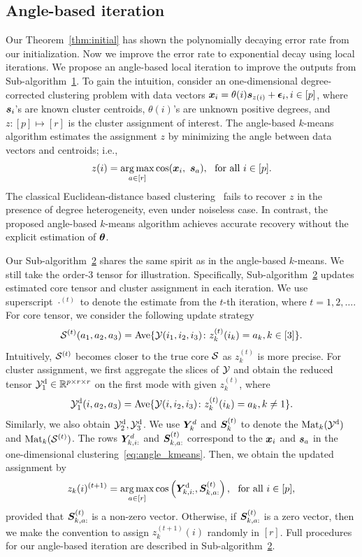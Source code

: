 \documentclass[journal]{IEEEtran}
\theoremstyle{definition}
\theoremstyle{definition}
\newcommand{\of}[1]{\left(#1\right)}
\begin{document}
\subsection{Angle-based iteration}\label{subsec:angle}
Our Theorem~\ref{thm:initial} has shown the polynomially decaying error rate from our initialization. Now we improve the error rate to exponential decay using local iterations. %
We propose an angle-based local iteration to improve the outputs from Sub-algorithm~\hyperref[alg:main]{1}. 
To gain the intuition, consider an one-dimensional degree-corrected clustering problem with data vectors $\bm x_i = \theta(i) \bm{s}_{z(i)} + \boldsymbol{\epsilon}_i, i \in [p]$, where $\bm{s}_i$'s are known cluster centroids, $\theta(i)$'s are unknown positive degrees, and $z\colon [p] \mapsto [r]$ is the cluster assignment of interest. The angle-based $k$-means algorithm estimates the assignment $z$ by minimizing the angle between data vectors and centroids; i.e., 
 \begin{equation}\label{eq:angle_kmeans}
     z(i) = \argmax_{a \in [r]} \cos ( \mx_i,\ \ms_{a} ),\ \text{ for all }i \in [p].
 \end{equation}
The classical Euclidean-distance based clustering~\citep{han2020exact} fails to recover $z$ in the presence of degree heterogeneity, even under noiseless case. In contrast, the proposed angle-based $k$-means algorithm
achieves accurate recovery without the explicit estimation of $\boldsymbol{\theta}$. 

Our Sub-algorithm~\hyperref[alg:main]{2} shares the same spirit as in the angle-based $k$-means. We still take the order-3 tensor for illustration. Specifically, Sub-algorithm~\hyperref[alg:main]{2} updates estimated core tensor and cluster assignment in each iteration. We use superscript $\cdot^{(t)}$ to denote the estimate from the $t$-th iteration, where $t=1, 2, \ldots.$ For core tensor, we consider the following update strategy  
 \[
 \mathcal{S}^{(t)}(a_1,a_2,a_3)=\text{Ave}\{\mathcal{Y}(i_1,i_2,i_3)\colon z^{(t)}_k(i_k)=a_k, k\in[3]\}.
\]
Intuitively, $\mathcal{S}^{(t)}$ becomes closer to the true core $\mathcal{S}$ as $z^{(t)}_k$ is more precise. For cluster assignment, we first aggregate the slices of $\mathcal{Y}$ and obtain the reduced tensor $\mathcal{Y}^{\text{d}}_1 \in \mathbb{R}^{p \times r \times r}$ on the first mode with given $z^{(t)}_k$, where
\[
\mathcal{Y}^{\text{d}}_1(i,a_2,a_3)=\text{Ave}\{\mathcal{Y}(i,i_2,i_3)\colon z^{(t)}_k(i_k)=a_k, k \neq 1\}.
\]
Similarly, we also obtain $\mathcal{Y}^{\text{d}}_2, \mathcal{Y}^{\text{d}}_3$.
We use $\bm Y_k^d$ and $ \bm S^{(t)}_k$ to denote the $\text{Mat}_k(\mathcal{Y}^{\text{d}})$ and $\text{Mat}_k(\mathcal{S}^{(t)})$. The rows $\bm Y^d_{k,i:}$ and $\bm S^{(t)}_{k,a:}$ correspond to the $\bm x_i$ and $\bm{s}_a$ in the one-dimensional clustering~\eqref{eq:angle_kmeans}. Then, we obtain the updated assignment by
\[
z_k(i)^{(t+1)} = \argmax_{a \in [r]} \cos \of{ \mY^{\text{d}}_{k,i:}, \mS^{(t)}_{k,a:} },\ \text{ for all } i \in [p],
\]
provided that $\bm S^{(t)}_{k,a:}$ is a non-zero vector. Otherwise, if $\bm S^{(t)}_{k,a:}$ is a zero vector, then we make the convention to assign $z^{(t+1)}_k(i)$ randomly in $[r]$. Full procedures for our angle-based iteration are described in Sub-algorithm~\hyperref[alg:main]{2}. 
\end{document}
